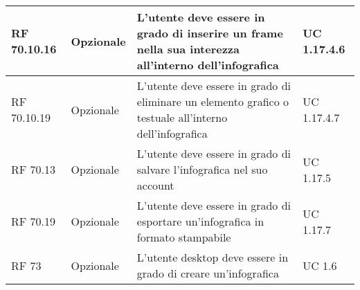 {\begin{longtable} [c]{| p{2.5cm} | p{2.5cm} | p{6cm} |p{2.5cm}|}
 \hline 
RF 70.10.16 & Opzionale & L'utente deve essere in grado di inserire un frame nella sua interezza all'interno dell'infografica & UC 1.17.4.6\\ 
 \hline 
RF 70.10.19 & Opzionale & L'utente deve essere in grado di eliminare un elemento grafico o testuale all'interno dell'infografica & UC 1.17.4.7\\ 
 \hline 
RF 70.13 & Opzionale & L'utente deve essere in grado di salvare l'infografica nel suo account & UC 1.17.5\\ 
 \hline 
RF 70.19 & Opzionale & L'utente deve essere in grado di esportare un'infografica in formato stampabile & UC 1.17.7\\ 
 \hline 
RF 73 & Opzionale & L'utente desktop deve essere in grado di creare un'infografica & UC 1.6\\ 
 \hline 
\end{longtable}}